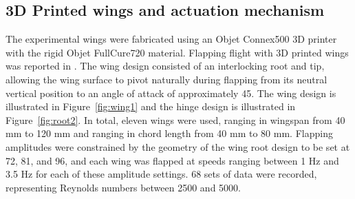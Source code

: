 \documentclass[fleqn,10pt]{wlscirep}
\begin{document}
\subsection{3D Printed wings and actuation mechanism}
The experimental wings were fabricated using an Objet Connex500 3D printer with
the rigid Objet FullCure720 material.
Flapping flight with 3D printed wings was reported in \cite{richter2011untethered}. The
wing design consisted of an interlocking root and tip, allowing the wing
surface to pivot naturally during flapping from its neutral vertical position
to an angle of attack of approximately 45\textdegree. The wing design is illustrated in
Figure~\ref{fig:wing1} and the hinge design is
illustrated in Figure~\ref{fig:root2}.  In total, eleven wings were used,
ranging in wingspan from 40 mm to 120 mm and ranging in chord length from 40 mm
to 80 mm. Flapping amplitudes were constrained by the geometry of the wing root
design to be set at 72\textdegree, 81\textdegree, and 96\textdegree, and each
wing was flapped at speeds ranging between 1 Hz and 3.5 Hz for each of these
amplitude settings.  68 sets of data were recorded, representing Reynolds
numbers between 2500 and 5000.
\end{document}
